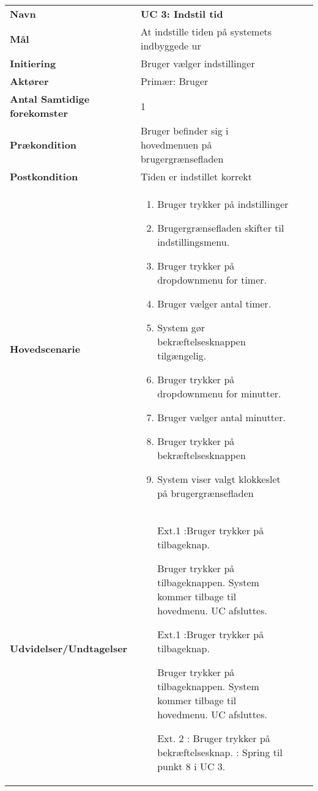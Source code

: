 \begin{longtable}{>{\bfseries}TX TX}
	Navn & \bfseries{UC 3: Indstil tid} \\
	Mål & At indstille tiden på systemets indbyggede ur\\
	Initiering & Bruger vælger indstillinger \\
	Aktører & Primær: Bruger \\
	Antal Samtidige forekomster & 1 \\
	Prækondition & Bruger befinder sig i hovedmenuen på brugergrænsefladen\\
	Postkondition & Tiden er indstillet korrekt \\
	Hovedscenarie & \begin{enumerate}
		\item Bruger trykker på indstillinger
		\item Brugergrænsefladen skifter til indstillingsmenu.
		\item Bruger trykker på dropdownmenu for timer.
		\item Bruger vælger antal timer.
		\item System gør bekræftelsesknappen tilgængelig.
		\item Bruger trykker på dropdownmenu for minutter.
		\item Bruger vælger antal minutter.
		\item Bruger trykker på bekræftelsesknappen 
		\item System viser valgt klokkeslet på brugergrænsefladen
		
	\end{enumerate} \\
	Udvidelser/Undtagelser & 
	\begin{enumerate}{}{}
		\item[Ext.1]:Bruger trykker på tilbageknap.
		
		\subitem[1.1] Bruger trykker på tilbageknappen.
		\subitem[1.2] System kommer tilbage til hovedmenu.	 
		\subitem[1.3]UC afsluttes. \newline 
	\end{enumerate}
	\begin{enumerate}{}{}
		\item[Ext.1]:Bruger trykker på tilbageknap.
		
		\subitem[1.1] Bruger trykker på tilbageknappen.
		\subitem[1.2] System kommer tilbage til hovedmenu.	 
		\subitem[1.3]UC afsluttes. \newline 
		\item [Ext. 2]: Bruger trykker på bekræftelsesknap.
		\subitem: Spring til punkt 8 i UC 3.
	\end{enumerate}
\end{longtable}